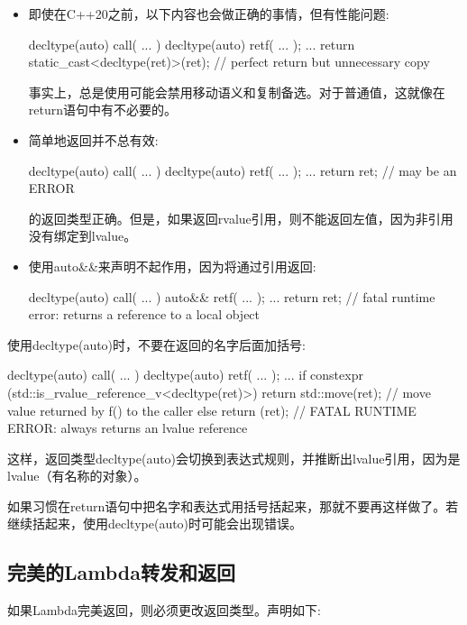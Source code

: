 \begin{itemize}
	\item 即使在C++20之前，以下内容也会做正确的事情，但有性能问题:

\begin{cppcode}
decltype(auto) call( ... )
{
	decltype(auto) ret{f( ... )};
	...
	return static_cast<decltype(ret)>(ret); // perfect return but unnecessary copy
}
\end{cppcode}
事实上，总是使用可能会禁用移动语义和复制备选。对于普通值，这就像在return语句中有不必要的。
\item 简单地返回并不总有效:
\begin{cppcode}
decltype(auto) call( ... )
{
	decltype(auto) ret{f( ... )};
	...
	return ret; // may be an ERROR
}
\end{cppcode}
的返回类型正确。但是，如果返回rvalue引用，则不能返回左值，因为非引用没有绑定到lvalue。
\item 使用auto\&\&来声明不起作用，因为将通过引用返回:
\begin{cppcode}
decltype(auto) call( ... )
{
	auto&& ret{f( ... )};
	...
	return ret; // fatal runtime error: returns a reference to a local object
}
\end{cppcode}
\end{itemize}

使用decltype(auto)时，不要在返回的名字后面加括号:

\begin{cppcode}
decltype(auto) call( ... )
{
	decltype(auto) ret{f( ... )};
	...
	if constexpr (std::is_rvalue_reference_v<decltype(ret)>) {
		return std::move(ret); // move value returned by f() to the caller
	}
	else {
		return (ret); // FATAL RUNTIME ERROR: always returns an lvalue reference
	}
}
\end{cppcode}

这样，返回类型decltype(auto)会切换到表达式规则，并推断出lvalue引用，因为是lvalue（有名称的对象）。

如果习惯在return语句中把名字和表达式用括号括起来，那就不要再这样做了。若继续括起来，使用decltype(auto)时可能会出现错误。

\subsection{完美的Lambda转发和返回}

如果Lambda完美返回，则必须更改返回类型。声明如下:

